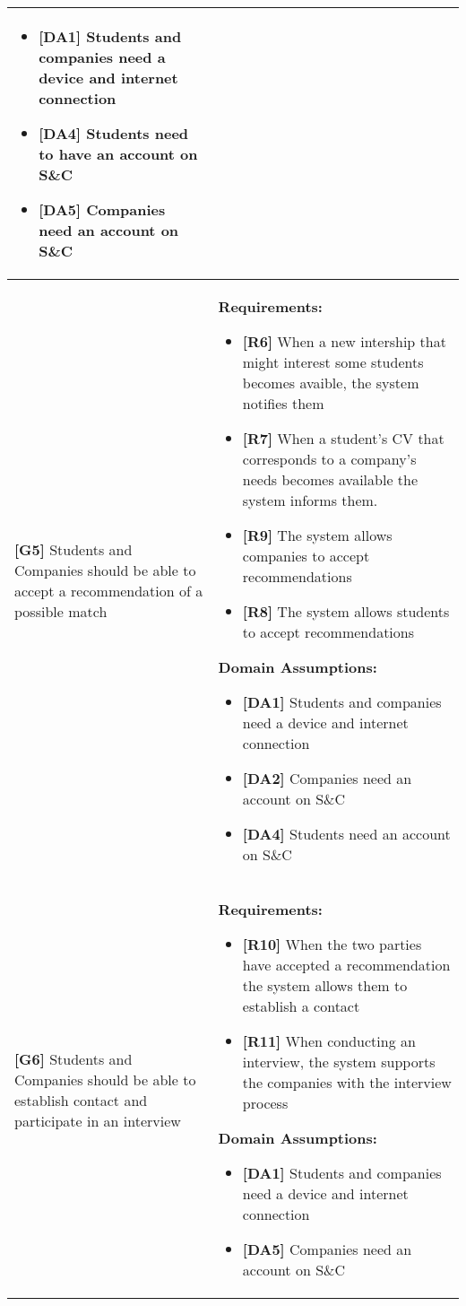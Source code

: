\begin{longtable}{|p{}|p{}|}
\begin{itemize}
    \item \textbf{[DA1]} Students and companies need a device and internet connection
    \item \textbf{[DA4]} Students need to have an account on S\&C
    \item \textbf{[DA5]} Companies need an account on S\&C
\end{itemize} \\
\hline
\textbf{[G5]} Students and Companies should be able to accept a recommendation of a possible match
& 
\textbf{Requirements:}
\begin{itemize}
    \item  \textbf{[R6]} When a new intership that might interest some students becomes avaible, the system notifies them
    \item  \textbf{[R7]} When a student’s CV that corresponds to a company’s needs becomes available the system informs them.
    \item  \textbf{[R9]} The system allows companies to accept recommendations
    \item  \textbf{[R8]} The system allows students to accept recommendations
\end{itemize}
\textbf{Domain Assumptions:}
\begin{itemize}
    \item \textbf{[DA1]} Students and companies need a device and internet connection
    \item \textbf{[DA2]} Companies need an account on S\&C
    \item \textbf{[DA4]} Students need an account on S\&C
\end{itemize} \\
\hline
\textbf{[G6]} Students and Companies should be able to establish contact and participate in an interview 
& 
\textbf{Requirements:}
\begin{itemize}
    \item \textbf{[R10]} When the two parties have accepted a recommendation the system allows them to establish a contact
    \item \textbf{[R11]} When conducting an interview, the system supports the companies with the interview process 
\end{itemize}
\textbf{Domain Assumptions:}
\begin{itemize}
    \item \textbf{[DA1]} Students and companies need a device and internet connection
    \item \textbf{[DA5]} Companies need an account on S\&C

\end{itemize}
\end{longtable}
